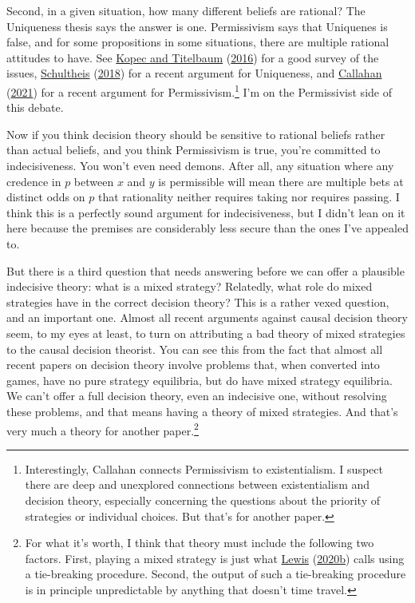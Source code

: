\documentclass[
  12pt,
]{article}
\begin{document}
Second, in a given situation, how many different beliefs are rational?
The Uniqueness thesis says the answer is one. Permissivism says that
Uniquenes is false, and for some propositions in some situations, there
are multiple rational attitudes to have. See
\protect\hyperlink{ref-KopecTitelbaum2016}{Kopec and Titelbaum}
(\protect\hyperlink{ref-KopecTitelbaum2016}{2016}) for a good survey of
the issues, \protect\hyperlink{ref-Schultheis2018}{Schultheis}
(\protect\hyperlink{ref-Schultheis2018}{2018}) for a recent argument for
Uniqueness, and \protect\hyperlink{ref-Callahan2021}{Callahan}
(\protect\hyperlink{ref-Callahan2021}{2021}) for a recent argument for
Permissivism.\footnote{Interestingly, Callahan connects Permissivism to
  existentialism. I suspect there are deep and unexplored connections
  between existentialism and decision theory, especially concerning the
  questions about the priority of strategies or individual choices. But
  that's for another paper.} I'm on the Permissivist side of this
debate.

Now if you think decision theory should be sensitive to rational beliefs
rather than actual beliefs, and you think Permissivism is true, you're
committed to indecisiveness. You won't even need demons. After all, any
situation where any credence in \(p\) between \(x\) and \(y\) is
permissible will mean there are multiple bets at distinct odds on \(p\)
that rationality neither requires taking nor requires passing. I think
this is a perfectly sound argument for indecisiveness, but I didn't lean
on it here because the premises are considerably less secure than the
ones I've appealed to.

But there is a third question that needs answering before we can offer a
plausible indecisive theory: what is a mixed strategy? Relatedly, what
role do mixed strategies have in the correct decision theory? This is a
rather vexed question, and an important one. Almost all recent arguments
against causal decision theory seem, to my eyes at least, to turn on
attributing a bad theory of mixed strategies to the causal decision
theorist. You can see this from the fact that almost all recent papers
on decision theory involve problems that, when converted into games,
have no pure strategy equilibria, but do have mixed strategy equilibria.
We can't offer a full decision theory, even an indecisive one, without
resolving these problems, and that means having a theory of mixed
strategies. And that's very much a theory for another paper.\footnote{For
  what it's worth, I think that theory must include the following two
  factors. First, playing a mixed strategy is just what
  \protect\hyperlink{ref-Lewis-Kavka-10071979}{Lewis}
  (\protect\hyperlink{ref-Lewis-Kavka-10071979}{2020b}) calls using a
  tie-breaking procedure. Second, the output of such a tie-breaking
  procedure is in principle unpredictable by anything that doesn't time
  travel.}
\end{document}
